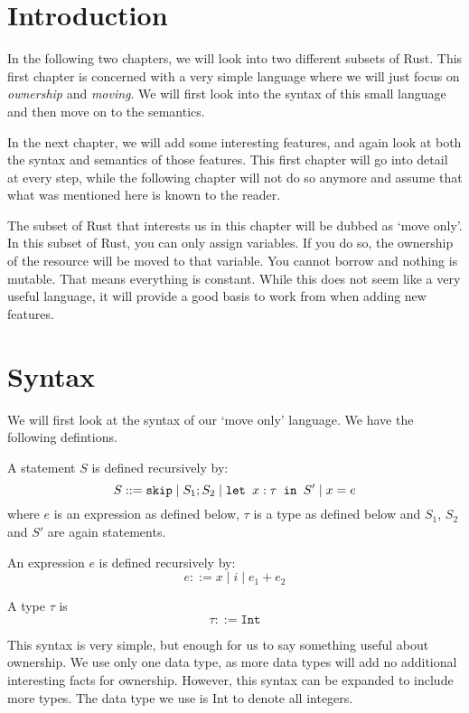\section{Introduction}
In the following two chapters, we will look into two different subsets of Rust. This first chapter is concerned with a very simple language where we will just focus on \emph{ownership} and \emph{moving}. We will first look into the syntax of this small language and then move on to the semantics. 

In the next chapter, we will add some interesting features, and again look at both the syntax and semantics of those features. This first chapter will go into detail at every step, while the following chapter will not do so anymore and assume that what was mentioned here is known to the reader.

The subset of Rust that interests us in this chapter will be dubbed as `move only'. In this subset of Rust, you can only assign variables. If you do so, the ownership of the resource will be moved to that variable. You cannot borrow and nothing is mutable. That means everything is constant. While this does not seem like a very useful language, it will provide a good basis to work from when adding new features.

\section{Syntax}
We will first look at the syntax of our `move only' language. We have the following defintions.

\begin{definition}
\label{statementsmove}
A statement $S$ is defined recursively by:
$$S ::= \texttt{skip} \mid S_1; S_2 \mid \texttt{let }x : \tau \texttt{ in } S' \mid x = e$$
where $e$ is an expression as defined below, $\tau$ is a type as defined below and $S_1$, $S_2$ and $S'$ are again statements.
\end{definition}

\begin{definition}
\label{expressionsmove}
An expression $e$ is defined recursively by:
$$e ::= x \mid i \mid e_1 + e_2$$
\end{definition}

\begin{definition}
\label{typesmove}
A type $\tau$ is
$$\tau ::= \texttt{Int}$$
\end{definition}

This syntax is very simple, but enough for us to say something useful about ownership. We use only one data type, as more data types will add no additional interesting facts for ownership. However, this syntax can be expanded to include more types. The data type we use is Int to denote all integers.

